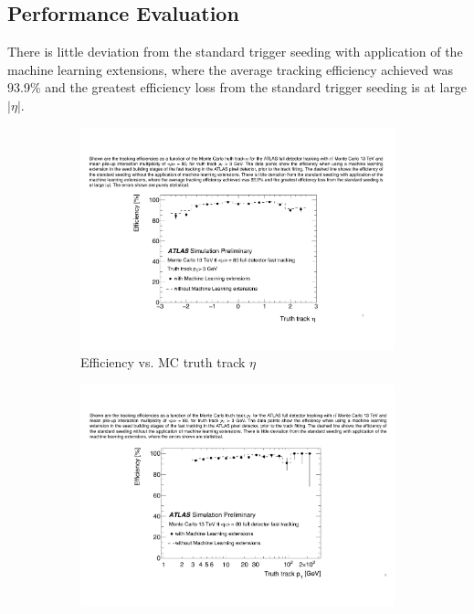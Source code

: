 \subsection{Performance Evaluation}

There is little deviation from the standard trigger seeding with application of the machine learning extensions, where the average tracking efficiency achieved was 93.9\% and the greatest efficiency loss from the standard trigger seeding is at large $\lvert \eta \rvert$.

\begin{figure}[!htbp]
\centering
    \begin{subfigure}[a]{0.86\textwidth}
        \includegraphics[width=\linewidth]{images/4-ml-based-predictor/efficiency_eta.pdf}
        \caption{Efficiency vs. MC truth track $\eta$}
    \end{subfigure}
    \hfill
    \begin{subfigure}[b]{0.86\textwidth}
        \centering
        \includegraphics[width=\linewidth]{images/4-ml-based-predictor/efficiency_pT.pdf}

\end{subfigure}
\end{figure}
